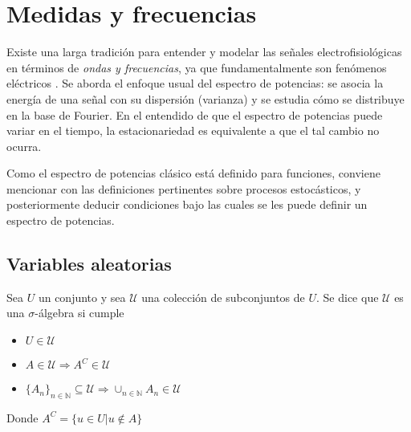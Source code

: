 
\chapter{Medidas y frecuencias}

Existe una larga tradición para entender y modelar las señales electrofisiológicas en términos de 
\textit{ondas y frecuencias}, ya que fundamentalmente son fenómenos eléctricos \cite{Kaiser00}.
%
Se aborda el enfoque usual del espectro de potencias: se asocia la energía de una señal con su 
dispersión (varianza) y se estudia cómo se distribuye en la base de Fourier.
%
En el entendido de que el espectro de potencias puede variar en el tiempo, la estacionariedad
es equivalente a que el tal cambio no ocurra.

Como el espectro de potencias clásico está definido para funciones, conviene mencionar con las 
definiciones pertinentes sobre procesos estocásticos, y posteriormente deducir condiciones bajo las 
cuales se les puede definir un espectro de potencias.


\section{Variables aleatorias}

\begin{definicion}
Sea $U$ un conjunto y sea $\mathcal{U}$ una colección de subconjuntos de $U$. Se dice que 
$\mathcal{U}$ es una $\sigma$-álgebra si cumple
\begin{itemize}
\item $U \in \mathcal{U}$
\item $A \in \mathcal{U} \Rightarrow A^{C} \in \mathcal{U}$
\item 
$ \displaystyle \{ A_n \}_{n\in \mathbb{N}} \subseteq \mathcal{U} 
\Rightarrow \cup_{n\in \mathbb{N}} A_n \in \mathcal{U}$
\end{itemize}
Donde $A^{C} = \{ u \in U | u \notin A \} $
\end{definicion}

